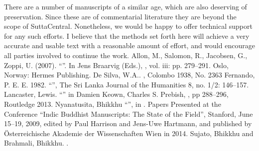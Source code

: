 {}There are a number of manuscripts of a similar age, which are also deserving of preservation. Since these are of commentarial literature they are beyond the scope of SuttaCentral. Nonetheless, we would be happy to offer technical support for any such efforts. I believe that the methods set forth here will achieve a very accurate and usable text with a reasonable amount of effort, and would encourage all parties involved to continue the work.\markdownRendererInterblockSeparator
{}\markdownRendererInterblockSeparator
{}\markdownRendererUlBeginTight
\markdownRendererUlItem Allon, M., Salomon, R., Jacobsen, G., Zoppi, U. (2007). “”. In Jens Braarvig (Eds.), , vol. iii: pp. 279–291. Oslo, Norway: Hermes Publishing.\markdownRendererUlItemEnd 
\markdownRendererUlItem De Silva, W.A.. , Colombo 1938, No. 2363\markdownRendererUlItemEnd 
\markdownRendererUlItem Fernando, P. E. E. 1982. “”, The Sri Lanka Journal of the Humanities 8, no. 1/2: 146–157.\markdownRendererUlItemEnd 
\markdownRendererUlItem Lancaster, Lewis. “” in Damien Keown, Charles S. Prebish, , pp 288–296, Routledge 2013.\markdownRendererUlItemEnd 
\markdownRendererUlItem Nyanatusita, Bhikkhu “”, in . Papers Presented at the Conference “Indic Buddhist Manuscripts: The State of the Field”, Stanford, June 15–19, 2009, edited by Paul Harrison and Jens-Uwe Hartmann, and published by Österreichische Akademie der Wissenschaften Wien in 2014.\markdownRendererUlItemEnd 
\markdownRendererUlItem Sujato, Bhikkhu and Brahmali, Bhikkhu. .\markdownRendererUlItemEnd 
\markdownRendererUlEndTight \relax